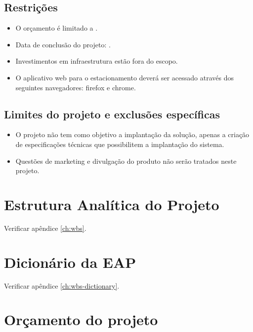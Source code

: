 \subsection{Restrições}

\begin{itemize}
	\item O orçamento é limitado a \maximumBudget{}.
	\item Data de conclusão do projeto: \maximumDeadline{}.
	\item Investimentos em infraestrutura estão fora do escopo.
	\item O aplicativo web para o estacionamento deverá ser acessado através dos seguintes navegadores: firefox e chrome.
\end{itemize}

\subsection{Limites do projeto e exclusões específicas}

\begin{itemize}
\item O projeto não tem como objetivo a implantação da solução, apenas a criação de especificações técnicas que possibilitem a implantação do sistema.
\item Questões de marketing e divulgação do produto não serão tratados neste projeto.
\end{itemize}

\section{Estrutura Analítica do Projeto}

Verificar apêndice \ref{ch:wbs}.

\section{Dicionário da EAP}

Verificar apêndice \ref{ch:wbs-dictionary}.

\section{Orçamento do projeto}

